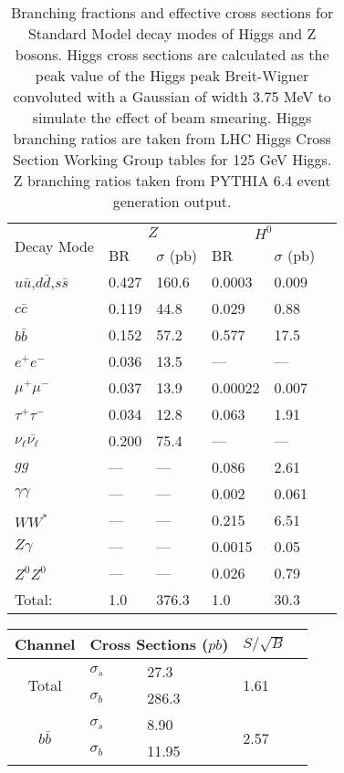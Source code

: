 \documentclass[a4paper]{article}
\begin{document}
\begin{table}
	\begin{center}
		\begin{tabular}{|l|l|l|l|l|l|}
			\hline
			\multirow{2}{*}{Decay Mode} & \multicolumn{2}{|c|}{$Z$} & \multicolumn{2}{|c|}{$H^0$} \\ \cline{2-5}
			& BR & $\sigma$ (pb) & BR & $\sigma$ (pb) \\ 
			\hline
			$u\bar{u}$,$d\bar{d}$,$s\bar{s}$ & 0.427 & 160.6 & 0.0003 & 0.009 \\ \hline
			$c\bar{c}$      & 0.119 & 44.8 & 0.029 & 0.88 \\ \hline
			$b\bar{b}$      & 0.152 & 57.2 & 0.577 & 17.5 \\ \hline
			$e^+e^-$        & 0.036 & 13.5 & --- & --- \\ \hline
			$\mu^+\mu^-$    & 0.037 & 13.9 & 0.00022 & 0.007 \\ \hline
			$\tau^+\tau^-$  & 0.034 & 12.8 & 0.063 & 1.91 \\ \hline
			$\nu_{\ell}\bar{\nu_{\ell}}$    & 0.200 & 75.4  & --- & --- \\ \hline
			$gg$                    & ---   & ---   & 0.086 & 2.61 \\ \hline
			$\gamma\gamma$			& ---   & ---   & 0.002 & 0.061 \\ \hline
			$WW^*$                  & ---   & ---   & 0.215 & 6.51 \\ \hline
			$Z\gamma$				& ---	& ---	& 0.0015& 0.05	\\ \hline
			$Z^0Z^0$                & ---   & ---   & 0.026 & 0.79 \\
			\hline \hline
			Total:  & 1.0 & 376.3 & 1.0 & 30.3 \\ \hline
		\end{tabular}
	\end{center}
	\caption{Branching fractions and effective cross sections for Standard Model decay modes of Higgs and Z bosons. Higgs cross sections are calculated as the peak value of the Higgs peak Breit-Wigner convoluted with a Gaussian of width 3.75 MeV to simulate the effect of beam smearing. Higgs branching ratios are taken from LHC Higgs Cross Section Working Group tables for 125 GeV Higgs. Z branching ratios taken from PYTHIA 6.4 event generation output.\label{bfs-xsects}}
\end{table}

\begin{table}
	\begin{tabular}{|c|l|l|l|l|}
		\hline
		Channel	& \multicolumn{2}{|c|}{Cross Sections ($pb$)}	& $S/\sqrt{B}$ \\
		\hline
		\multirow{2}{*}{Total}
			& $\sigma_s$	& 27.3	& \multirow{2}{*}{1.61} \\
			& $\sigma_b$	& 286.3 &	\\
		\hline
		\multirow{2}{*}{$b\bar{b}$}
			& $\sigma_s$	& 8.90	& \multirow{2}{*}{2.57} \\
			& $\sigma_b$	& 11.95 &	\\
		\hline
	\end{tabular}
\end{table}
\end{document}
